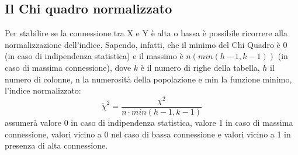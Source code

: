 \subsection{Il Chi quadro normalizzato}
\label{subsec:stat02_chi_normalizzato}

 Per stabilire se la connessione tra X e Y è alta o bassa è possibile 
ricorrere alla normalizzazione dell'indice. Sapendo, infatti, che il minimo 
del Chi Quadro è 0 (in caso di indipendenza statistica) e il massimo è 
\(n(min(h-1,k-1))\)  (in caso di massima connessione), dove \(k\) è il numero 
di righe della tabella, \(h\) il numero di colonne, n la numerosità della 
popolazione e min la funzione minimo, l'indice normalizzato:
 \[\widetilde{\chi}^2=\frac{\chi^2}{n\cdot min(h-1,k-1)}\]
 assumerà valore 0 in caso di indipendenza statistica, valore 1 in caso di 
massima connessione, valori vicino a 0 nel caso di bassa connessione e 
valori vicino a 1 in presenza di alta connessione.

